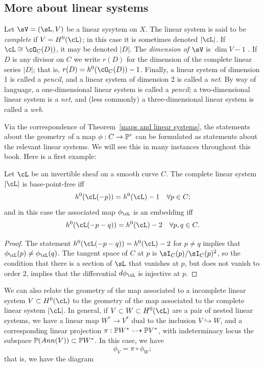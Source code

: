 \subsection{More about linear systems}
Let $\sV = (\sL, V)$ be a linear sysytem on $X$.  The linear system is said to be \emph{complete} if $V = H^0(\cL)$; in this case it is sometimes denoted $|\cL|$. If $\cL \cong \cO_C(D))$, it may be denoted $|D|$. 
The \emph{dimension of $\sV$} is $\dim V -1$ . If $D$ is any divisor on $C$ we write $r(D)$ for the dimension of the complete linear series $|D|$; that is, $r(D) = h^0(\cO_C(D)) - 1$. Finally, a linear system of dimension 1 is called a \emph{pencil}, and a linear system of dimension 2 is called a \emph{net}.  By way of language, a one-dimensional linear system is called a \emph{pencil}; a two-dimensional linear system is a \emph{net}, and (less commonly) a three-dimensional linear system is called a \emph{web}.


Via the correspondence of Theorem~\ref{maps and linear systems}, the statements about the geometry of a map $\phi : C \to \PP^r$ can be formulated as statements about the relevant linear systems. We will see this in many instances throughout this book. Here is a first example:

\begin{proposition}\label{very ample}\cite[Thm. IV.3.1]{H}
Let $\cL$ be an invertible sheaf on a smooth curve $C$. The complete linear system $|\cL|$ is base-point-free iff
$$
h^0(\cL(-p)) = h^0(\cL) - 1 \quad \forall p \in C;
$$
and in this case the associated map $\phi_\cL$ is an embedding iff
$$
h^0(\cL(-p-q)) = h^0(\cL) - 2 \quad \forall p, q \in C.
$$
\end{proposition} 

\begin{proof}
The statement $h^0(\cL(-p-q)) = h^0(\cL) - 2$ for $p \neq q$ implies that $\phi_\cL(p) \neq \phi_\cL(q)$. The tangent space of $C$ at $p$ is $\sI_C(p)/\sI_C(p)^2$, so the condition that there is a section of $\sL$ that vanishes at $p$, but does not vanish
to order 2, implies that the differential $d\phi_\cL$ is injective at $p$.
\end{proof}

We can also relate the geometry of the map associated to a incomplete linear system $V \subset H^0(\cL)$ to the geometry of the map associated to the complete linear system $|\cL|$. In general, if $V \subset W \subset H^0(\cL)$ are a pair of nested linear systems, we have a linear map $W^* \to V^*$ dual to the inclusion $V \hookrightarrow W$, and a corresponding linear projection $\pi : \PP W^* \dashrightarrow \PP V^*$, with indeterminacy locus the subspace $\PP(Ann(V)) \subset \PP W^*$. In this case, we have 
$$
\phi_V = \pi \circ \phi_W;
$$
that is, we have the diagram 

